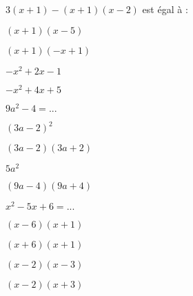 



\begin{QCM}
  \begin{GroupeQCM} 

    \begin{exercice}
      $3(x+1)-(x+1)(x-2)$ est égal à :
      \begin{ChoixQCM}{4}
      \item $(x+1)(x-5)$
      \item $(x+1)(-x+1)$
      \item $-x^2+2x-1$
      \item $-x^2+4x+5$
      \end{ChoixQCM}
      \begin{corrige}
   \end{corrige}
    \end{exercice}


    \begin{exercice}
      $9a^2-4=...$
      \begin{ChoixQCM}{4}
      \item $(3a-2)^2$
      \item $(3a-2)(3a+2)$
      \item $5a^2$
      \item $(9a-4)(9a+4)$
      \end{ChoixQCM}
      \begin{corrige}
   \end{corrige}
    \end{exercice}
    
    
     \begin{exercice}
      $x^2-5x+6=...$
      \begin{ChoixQCM}{4}
      \item $(x-6)(x+1)$
      \item $(x+6)(x+1)$
      \item $(x-2)(x-3)$
      \item $(x-2)(x+3)$
      \end{ChoixQCM}
      \begin{corrige}
   \end{corrige}
    \end{exercice}
    

\end{GroupeQCM}
\end{QCM}
